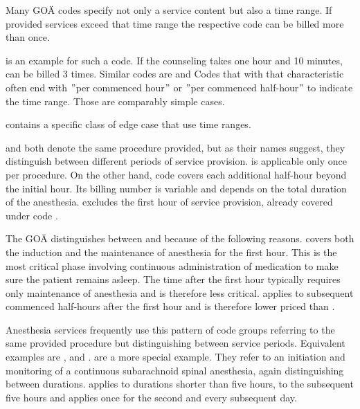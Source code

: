 Many GOÄ codes specify not only a service content but also a time range.
If provided services exceed that time range the respective code can be billed more than once.

 is an example for such a code.
If the counseling takes one hour and 10 minutes,  can be billed 3 times.
Similar codes are 
and 
Codes that with that characteristic often end with \("\)per commenced hour\("\) or \("\)per commenced half-hour\("\) to indicate the time range.
Those are comparably simple cases.

 contains a specific class of edge case that use time ranges.

 and 
both denote the same procedure provided, but as their names suggest, they distinguish between different periods of service provision.
 is applicable only once per procedure.
On the other hand, code  covers each additional half-hour beyond the initial hour.
Its billing number is variable and depends on the total duration of the anesthesia.
 excludes the first hour of service provision, already covered under code .

The GOÄ distinguishes between  and  because of the following reasons.
 covers both the induction and the maintenance of anesthesia for the first hour.
This is the most critical phase involving continuous administration of medication to make sure the patient remains asleep.
The time after the first hour typically requires only maintenance of anesthesia and is therefore less critical.
 applies to subsequent commenced half-hours after the first hour and is therefore lower priced than .


Anesthesia services frequently use this pattern of code groups referring to the same provided procedure but distinguishing between service periods.
Equivalent examples are ,  and .
 are a more special example.
They refer to an initiation and monitoring of a continuous subarachnoid spinal anesthesia, again distinguishing between durations.
 applies to durations shorter than five hours,  to the subsequent five hours and  applies once for the second and every subsequent day.

